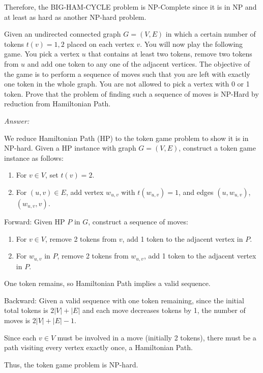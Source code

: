 \documentclass[12pt]{article}
\newenvironment{problem}[2][Problem]{\begin{trivlist}
\item[\hskip \labelsep {\bfseries #1}\hskip \labelsep {\bfseries #2.}]}{\end{trivlist}}
\begin{document}
Therefore, the BIG-HAM-CYCLE problem is NP-Complete since it is in NP and at least as hard as another NP-hard problem.

\begin{problem}{3}
    Given an undirected connected graph $G=(V,E)$ in which a certain number of tokens $t(v)=1, 2$ placed on each vertex $v$. You will now play the following game. You pick a vertex $u$ that contains at least two tokens, remove two tokens from $u$ and add one token to any one of the adjacent vertices. The objective of the game is to perform a sequence of moves such that you are left with exactly one token in the whole graph. You are not allowed to pick a vertex with 0 or 1 token. Prove that the problem of finding such a sequence of moves is NP-Hard by reduction from Hamiltonian Path.
\end{problem}

\textit{Answer: }

We reduce Hamiltonian Path (HP) to the token game problem to show it is in NP-hard. Given a HP instance with graph $G=(V, E)$, construct a token game instance as follows:
\begin{enumerate}
    \item For $v \in V$, set $t(v) = 2$.
    \item For $(u, v) \in E$, add vertex $w_{u,v}$ with $t(w_{u,v}) = 1$, and edges $(u, w_{u,v})$, $(w_{u,v}, v)$.
\end{enumerate}

Forward: Given HP $P$ in $G$, construct a sequence of moves:

\begin{enumerate}
    \item For $v \in V$, remove 2 tokens from $v$, add 1 token to the adjacent vertex in $P$.
    \item For $w_{u,v}$ in $P$, remove 2 tokens from $w_{u,v}$, add 1 token to the adjacent vertex in $P$.
\end{enumerate}
    
One token remains, so Hamiltonian Path implies a valid sequence.

Backward: Given a valid sequence with one token remaining, since the initial total tokens is $2|V| + |E|$ and each move decreases tokens by 1, the number of moves is $2|V| + |E| - 1$.

Since each $v \in V$ must be involved in a move (initially 2 tokens), there must be a path visiting every vertex exactly once, a Hamiltonian Path.

Thus, the token game problem is NP-hard.
\end{document}
